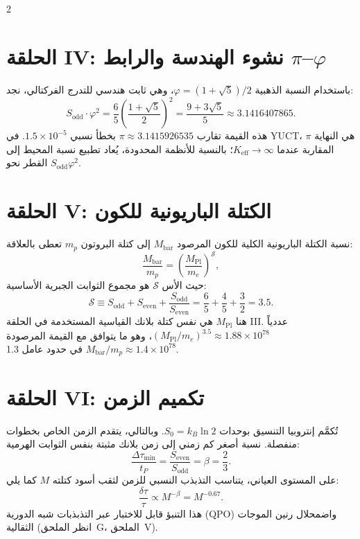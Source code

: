 \documentclass[12pt,a4paper]{article}
\newcommand{\Keff}{K_{\mathrm{eff}}}
\begin{document}
	\begin{multicols}{2}
		\raggedleft
		
		\section{الحلقة IV: نشوء الهندسة والرابط \(\pi\)–\(\varphi\)}
		
		باستخدام النسبة الذهبية \(\varphi = (1+\sqrt{5})/2\)، وهي ثابت هندسي للتدرج الفركتالي، نجد:
		\begin{equation}
			S_{\mathrm{odd}} \cdot \varphi^2 = \frac{6}{5} \left( \frac{1+\sqrt{5}}{2} \right)^2 = \frac{9+3\sqrt{5}}{5} \approx 3.1416407865.
		\end{equation}
		هذه القيمة تقارب \(\pi \approx 3.1415926535\) بخطأ نسبي \(1.5 \times 10^{-5}\). في YUCT، \(\pi\) هي النهاية المقاربة عندما \(\Keff \to \infty\)؛ بالنسبة للأنظمة المحدودة، يُعاد تطبيع نسبة المحيط إلى القطر نحو \(S_{\mathrm{odd}}\varphi^2\).
		
		\section{الحلقة V: الكتلة الباريونية للكون}
		
		نسبة الكتلة الباريونية الكلية للكون المرصود \(M_{\mathrm{bar}}\) إلى كتلة البروتون \(m_p\) تعطى بالعلاقة:
		\begin{equation}
			\frac{M_{\mathrm{bar}}}{m_p} = \left( \frac{M_{\mathrm{Pl}}}{m_e} \right)^{\mathcal{S}},
		\end{equation}
		حيث الأس \(\mathcal{S}\) هو مجموع الثوابت الجبرية الأساسية:
		\begin{equation}
			\mathcal{S} \equiv S_{\mathrm{odd}} + S_{\mathrm{even}} + \frac{S_{\mathrm{odd}}}{S_{\mathrm{even}}} = \frac{6}{5} + \frac{4}{5} + \frac{3}{2} = 3.5.
		\end{equation}
		هنا \(M_{\mathrm{Pl}}\) هي نفس كتلة بلانك القياسية المستخدمة في الحلقة III. عددياً \((M_{\mathrm{Pl}}/m_e)^{3.5} \approx 1.88 \times 10^{78}\)، وهو ما يتوافق مع القيمة المرصودة \(M_{\mathrm{bar}}/m_p \approx 1.4 \times 10^{78}\) في حدود عامل 1.3.
		
		\section{الحلقة VI: تكميم الزمن}
		
		تُكمَّم إنتروبيا التنسيق بوحدات \(S_0 = k_B \ln 2\). وبالتالي، يتقدم الزمن الخاص بخطوات منفصلة. نسبة أصغر كم زمني إلى زمن بلانك مثبتة بنفس الثوابت الهرمية:
		\begin{equation}
			\boxed{\frac{\Delta \tau_{\min}}{t_P} = \frac{S_{\mathrm{even}}}{S_{\mathrm{odd}}} = \beta = \frac{2}{3}}.
		\end{equation}
		على المستوى العياني، يتناسب التذبذب النسبي للزمن لثقب أسود كتلته \(M\) كما يلي:
		\begin{equation}
			\frac{\delta \tau}{\tau} \propto M^{-\beta} = M^{-0.67}.
		\end{equation}
		هذا التنبؤ قابل للاختبار عبر التذبذبات شبه الدورية (QPO) واضمحلال رنين الموجات الثقالية (انظر الملحق~G، الملحق~V).
		

\end{multicols}
\end{document}
